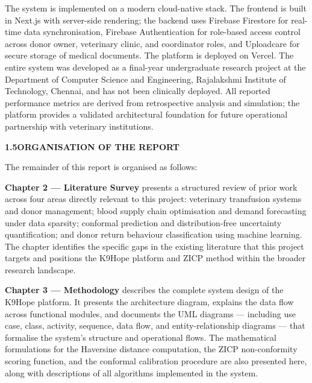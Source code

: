 \documentclass[12pt,a4paper]{article}
\begin{document}
\noindent The system is implemented on a modern cloud-native stack. The frontend is built in Next.js with server-side rendering; the backend uses Firebase Firestore for real-time data synchronisation, Firebase Authentication for role-based access control across donor owner, veterinary clinic, and coordinator roles, and Uploadcare for secure storage of medical documents. The platform is deployed on Vercel. The entire system was developed as a final-year undergraduate research project at the Department of Computer Science and Engineering, Rajalakshmi Institute of Technology, Chennai, and has not been clinically deployed. All reported performance metrics are derived from retrospective analysis and simulation; the platform provides a validated architectural foundation for future operational partnership with veterinary institutions.

\vspace{1.5em}
\noindent\textbf{1.5\quad ORGANISATION OF THE REPORT}
\vspace{0.6em}

\noindent The remainder of this report is organised as follows:

\vspace{0.6em}
\noindent \textbf{Chapter 2 — Literature Survey} presents a structured review of prior work across four areas directly relevant to this project: veterinary transfusion systems and donor management; blood supply chain optimisation and demand forecasting under data sparsity; conformal prediction and distribution-free uncertainty quantification; and donor return behaviour classification using machine learning. The chapter identifies the specific gaps in the existing literature that this project targets and positions the K9Hope platform and ZICP method within the broader research landscape.

\vspace{0.6em}
\noindent \textbf{Chapter 3 — Methodology} describes the complete system design of the K9Hope platform. It presents the architecture diagram, explains the data flow across functional modules, and documents the UML diagrams — including use case, class, activity, sequence, data flow, and entity-relationship diagrams — that formalise the system's structure and operational flows. The mathematical formulations for the Haversine distance computation, the ZICP non-conformity scoring function, and the conformal calibration procedure are also presented here, along with descriptions of all algorithms implemented in the system.
\end{document}
